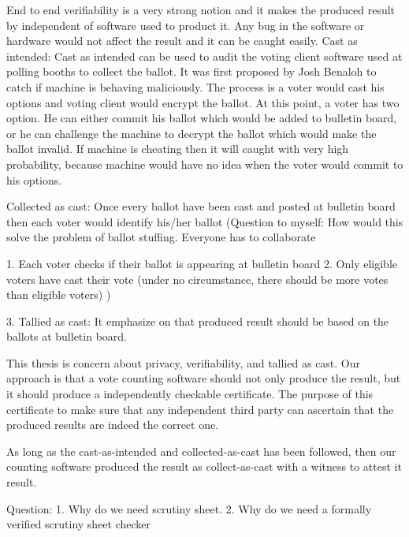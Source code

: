   
  End to end verifiability is a very strong notion and it makes the 
  produced result by independent of software used to product it. 
  Any bug in the software or hardware would not affect the result 
  and it can be caught easily. 
  Cast as intended: Cast as intended can be used to audit the voting client 
  software used at polling booths to collect the ballot. It was first proposed 
  by Josh Benaloh to catch if machine is behaving maliciously. The process is 
  a voter would cast his options and voting client would encrypt the ballot. 
  At this point, a voter has two option. He can either commit his ballot which 
  would be added to bulletin board, or he can challenge the machine to decrypt
  the ballot which would make the ballot invalid. If machine is cheating then 
  it will caught with very high probability, because machine would have no idea 
  when the voter would commit to his options. 
  
  Collected as cast: Once every ballot have been cast and posted at bulletin board 
  then each voter would identify his/her ballot (Question to myself: How would 
  this solve the problem of ballot stuffing. Everyone has to collaborate
  
  1. Each voter checks if their ballot is appearing at bulletin board
  2. Only eligible voters have cast their vote (under no circumstance, there 
  should be more votes than eligible voters) 
  )
  
  3. Tallied as cast: 
   It emphasize on that produced result should be based on the ballots at bulletin
   board. 
   
   
   This thesis is concern about privacy, verifiability, and tallied as cast. Our approach 
   is that a vote counting software should not only produce the result, but it should 
   produce a independently checkable certificate. The purpose of this 
   certificate to make sure that any independent third party can ascertain that 
   the produced results are indeed the correct one.  
   
   
   As long as the cast-as-intended and collected-as-cast has been followed,
   then our counting software produced the result as collect-as-cast with 
  a witness to attest it result. 
  
  Question:
  1. Why do we need scrutiny sheet. 
  2. Why do we need a formally verified scrutiny sheet checker
  
